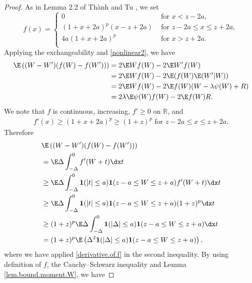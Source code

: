 	
	\begin{proof}
		As in Lemma 2.2 of Th\`{a}nh and Tu \cite{thanh2025non}, we set
		\[f(x) = \begin{cases}
			0 &\text{ for } x < z-2a,  \\
			(1+x+2a)^p(x-z+2a) &\text{ for } z-2a \le x \le z+2a,  \\
			4a(1+x+2a)^p &\text{ for }x > z+2a.  \\ 
		\end{cases} \]
		Applying the exchangeability and \eqref{nonlinear2}, we have
		\begin{equation}\label{sp}
			\begin{split}
				\E\left((W-W')(f(W)-f(W'))\right)&= 2\E Wf(W)-2\E W'f(W)\\
				&= 2\E Wf(W)-2\E(f(W)\E(W'|W))\\
				&= 2\E Wf(W)-2\E f(W)(W - \lambda \psi(W) + R)\\
				&=2\lambda \E \psi(W)f(W)-2\E f(W)R.
			\end{split}
		\end{equation}
		We note that $f$ is continuous, increasing, $f' \ge 0$ on $\mathbb{R}$, and 
		\begin{equation}\label{derivative.of.f}
			\begin{split}
				f'(x) \ge (1+x+2a)^p \ge (1+z)^p \text{ for }z-2a \le x \le z+2a.
			\end{split}
		\end{equation}
		Therefore
		\begin{equation}\label{LHS} 
			\begin{split}
				&\E\left((W-W')(f(W)-f(W'))\right)\\
				&= \E\Delta \int_{-\Delta}^0 f'(W+t)\dx t \\
				&\ge \E\Delta \int_{-\Delta}^0 \mathbf{1}(|t|\le a)\mathbf{1}(z-a\le W \le z+a)f'(W+t)\dx t \\
				&\ge \E\Delta \int_{-\Delta}^0 \mathbf{1}(|t|\le a)\mathbf{1}(z-a \le W \le z+a)(1+z)^p\dx t \\
				&\ge (1+z)^p\E\Delta \int_{-\Delta}^0 \mathbf{1}(|\Delta|\le a)\mathbf{1}(z-a \le W \le z+a)\dx t \\
				&= (1+z)^p \E\left(\Delta^2\mathbf{1}(|\Delta|\le a)\mathbf{1}(z-a \le W \le z+a)\right),
			\end{split}
		\end{equation}
		where we have applied \eqref{derivative.of.f} in the second inequality.
		By using 
		definition of $f$, the Cauchy--Schwarz inequality
		and Lemma \ref{lem.bound.moment.W}, we have

\end{proof}
